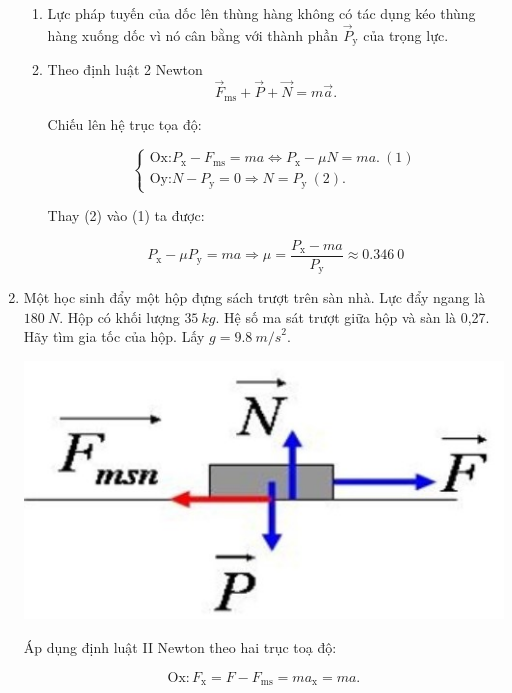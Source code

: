 \begin{enumerate}[label=\bfseries Câu \arabic*:]
{\begin{enumerate}[label=\alph*)]
			\item Lực pháp tuyến của dốc lên thùng hàng không có tác dụng kéo thùng hàng xuống dốc vì nó cân bằng với thành phần $\vec P_\text{y}$
			của trọng lực.
			
		
			\item Theo định luật 2 Newton
			$$\vec F_\text{ms} + \vec P + \vec N = m\vec a.$$
			
			Chiếu lên hệ trục tọa độ:
			
			$$\begin{cases}
				\text{Ox:}  P_\text{x} - F_\text{ms} =ma \Leftrightarrow  P_\text{x} - \mu N = ma.\ (1) \\
				\text{Oy:}  N - P_\text{y}= 0 \Rightarrow N =P_\text{y}\ (2).
				
			\end{cases}$$
		
			Thay (2) vào (1) ta được:
			
			$$ P_\text{x} - \mu P_\text{y} = ma \Rightarrow \mu = \dfrac{ P_\text{x}  -ma}{ P_\text{y}} \approx \SI{0,346}{0} $$
		\end{enumerate}
	}
	\item {}
	
	
	{
		Một học sinh đẩy một hộp đựng sách trượt trên sàn nhà. Lực đẩy ngang là $\SI{180}{N}$. Hộp có khối lượng $\SI{35}{kg}$. Hệ số ma sát trượt giữa hộp và sàn là 0,27. Hãy tìm gia tốc của hộp. Lấy $g = \SI{9,8}{m/s}^2$.
	}
	
	\hideall
	{
		\begin{center}
			\includegraphics[scale=0.6]{../figs/VN10-2022-PH-TP021-4.jpg}
		\end{center}
	
	Áp dụng định luật II Newton theo hai trục toạ độ:
	
	$$\text{Ox}: F_\text{x} = F - F_\text{ms} = ma_\text{x} = ma.$$
	
}
\end{enumerate}
